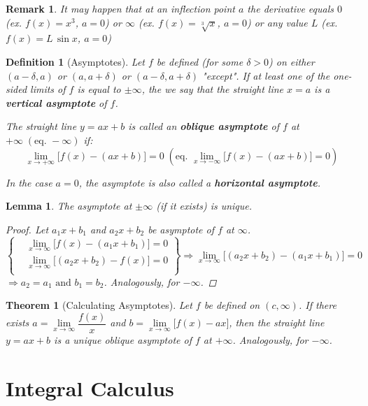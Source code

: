 \documentclass[12pt]{article}
\let\RA\Rightarrow
\newtheorem{theorem}{Theorem}[subsection]
\newtheorem{definition}{Definition}[subsection]
\newtheorem{lemma}{Lemma}[subsection]
\newtheorem{remark}{Remark}[subsection]
\begin{document}
\begin{remark}
  It may happen that at an inflection point $a$ the derivative equals $0$ (ex. $f(x)=x^3$, $a=0$) or $\infty$ (ex. $f(x)=\sqrt[3]{x}$, $a=0$) or any value $L$ (ex. $f(x)=L\,\sin{x}$, $a=0$)
\end{remark}

\begin{definition}[Asymptotes]
  Let $f$ be defined (for some $\delta>0$) on either $(a-\delta,a)$ or $(a,a+\delta)$ or $(a-\delta,a+\delta)$ "except". If at least one of the one-sided limits of $f$ is equal to $\pm\infty$, the we say that the straight line $x=a$ is a \textbf{vertical asymptote} of $f$.

  The straight line $y=ax+b$ is called an \textbf{oblique asymptote} of $f$ at $+\infty\;(\text{eq. }-\infty)$ if:
  $$\lim_{x\to+\infty}\big[f(x)-(ax+b)\big]=0\;\left(\text{eq. }\lim_{x\to-\infty}\big[f(x)-(ax+b)\big]=0\right)$$
  
  In the case $a=0$, the asymptote is also called a \textbf{horizontal asymptote}.  
\end{definition}

\begin{lemma}
  The asymptote at $\pm\infty$ (if it exists) is unique.
  \begin{proof}
    Let $a_1x+b_1$ and $a_2x+b_2$ be asymptote of $f$ at $\infty$. $$\left\{
    \begin{aligned}
      &\lim_{x\to\infty}\big[f(x)-(a_1x+b_1)\big]=0\\
      &\lim_{x\to\infty}\big[(a_2x+b_2)-f(x)\big]=0\\
    \end{aligned}\right\}
    \RA \lim_{x\to\infty}\big[(a_2x+b_2)-(a_1x+b_1)\big]=0$$
    $\RA a_2=a_1 \text{ and } b_1=b_2$. Analogously, for $-\infty$.
  \end{proof}
\end{lemma}

\begin{theorem}[Calculating Asymptotes]
  Let $f$ be defined on $(c,\infty)$. If there exists $a=\lim\limits_{x\to\infty}\dfrac{f(x)}{x}$ and $b=\lim\limits_{x\to\infty}\big[f(x)-ax\big]$, then the straight line $y=ax+b$ is a unique oblique asymptote of $f$ at $+\infty$. Analogously, for $-\infty$.
\end{theorem}

\pagebreak

\section{Integral Calculus}
\end{document}
